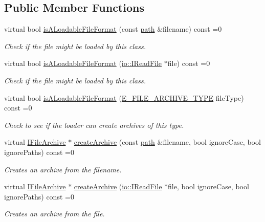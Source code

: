 \subsection*{Public Member Functions}
\begin{DoxyCompactItemize}
\item 
virtual bool \hyperlink{classirr_1_1io_1_1IArchiveLoader_a9835ccbfd2c261edf4a738421c488ce3}{is\+A\+Loadable\+File\+Format} (const \hyperlink{namespaceirr_1_1io_ab1bdc45edb3f94d8319c02bc0f840ee1}{path} \&filename) const =0
\begin{DoxyCompactList}\small\item\em Check if the file might be loaded by this class. \end{DoxyCompactList}\item 
virtual bool \hyperlink{classirr_1_1io_1_1IArchiveLoader_acda22c3c2a5268665a4a4cf17379931b}{is\+A\+Loadable\+File\+Format} (\hyperlink{classirr_1_1io_1_1IReadFile}{io\+::\+I\+Read\+File} $\ast$file) const =0
\begin{DoxyCompactList}\small\item\em Check if the file might be loaded by this class. \end{DoxyCompactList}\item 
virtual bool \hyperlink{classirr_1_1io_1_1IArchiveLoader_af60c081f27ab941702a4a32dfe482c05}{is\+A\+Loadable\+File\+Format} (\hyperlink{namespaceirr_1_1io_adb3e3c445ec8e608ed1f0f93306da14f}{E\+\_\+\+F\+I\+L\+E\+\_\+\+A\+R\+C\+H\+I\+V\+E\+\_\+\+T\+Y\+PE} file\+Type) const =0
\begin{DoxyCompactList}\small\item\em Check to see if the loader can create archives of this type. \end{DoxyCompactList}\item 
virtual \hyperlink{classirr_1_1io_1_1IFileArchive}{I\+File\+Archive} $\ast$ \hyperlink{classirr_1_1io_1_1IArchiveLoader_a55e9586f190588e5fea6d17f63fb7aad}{create\+Archive} (const \hyperlink{namespaceirr_1_1io_ab1bdc45edb3f94d8319c02bc0f840ee1}{path} \&filename, bool ignore\+Case, bool ignore\+Paths) const =0
\begin{DoxyCompactList}\small\item\em Creates an archive from the filename. \end{DoxyCompactList}\item 
virtual \hyperlink{classirr_1_1io_1_1IFileArchive}{I\+File\+Archive} $\ast$ \hyperlink{classirr_1_1io_1_1IArchiveLoader_acd4a78189c62db96e4e10aa89c934980}{create\+Archive} (\hyperlink{classirr_1_1io_1_1IReadFile}{io\+::\+I\+Read\+File} $\ast$file, bool ignore\+Case, bool ignore\+Paths) const =0
\begin{DoxyCompactList}\small\item\em Creates an archive from the file. \end{DoxyCompactList}\end{DoxyCompactItemize}
